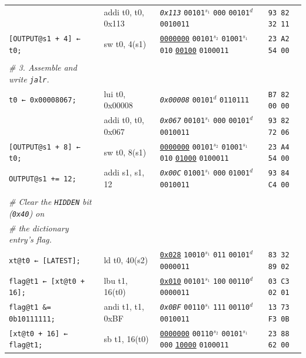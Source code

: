 \documentclass[a4paper,12pt,final]{article}
\begin{document}
\begin{table}[!htbp]
\begin{adjustwidth}{-1cm}{-1cm}
\begin{center}
\begin{tabular}{l|ll|l}
 & addi t0, t0, 0x113 & \emph{\texttt{0x113}}                    \texttt{00101}​\(^{s_{1}}\) \texttt{000} \texttt{00101}​\(^{d}\)  \texttt{0010011} & \texttt{93 82 32 11}\\[0pt]
\texttt{[OUTPUT@s1 + 4] ← t0;} & sw t0, 4(s1) & \uline{\texttt{0000000}} \texttt{00101}​\(^{s_{2}}\) \texttt{01001}​\(^{s_{1}}\) \texttt{010} \uline{\texttt{00100}} \texttt{0100011} & \texttt{23 A2 54 00}\\[0pt]
 &  &  & \\[0pt]
\emph{\# 3. Assemble and write \texttt{jalr}.} &  &  & \\[0pt]
\texttt{t0 ← 0x00008067;} & lui t0, 0x00008 & \emph{\texttt{0x00008}}                                                  \texttt{00101}​\(^{d}\)  \texttt{0110111} & \texttt{B7 82 00 00}\\[0pt]
 & addi t0, t0, 0x067 & \emph{\texttt{0x067}}                    \texttt{00101}​\(^{s_{1}}\) \texttt{000} \texttt{00101}​\(^{d}\)  \texttt{0010011} & \texttt{93 82 72 06}\\[0pt]
\texttt{[OUTPUT@s1 + 8] ← t0;} & sw t0, 8(s1) & \uline{\texttt{0000000}} \texttt{00101}​\(^{s_{2}}\) \texttt{01001}​\(^{s_{1}}\) \texttt{010} \uline{\texttt{01000}} \texttt{0100011} & \texttt{23 A4 54 00}\\[0pt]
\texttt{OUTPUT@s1 += 12;} & addi s1, s1, 12 & \emph{\texttt{0x00C}}                    \texttt{01001}​\(^{s_{1}}\) \texttt{000} \texttt{01001}​\(^{d}\)  \texttt{0010011} & \texttt{93 84 C4 00}\\[0pt]
 &  &  & \\[0pt]
\emph{\# Clear the \texttt{HIDDEN} bit (\texttt{0x40}) on} &  &  & \\[0pt]
\emph{\# the dictionary entry's flag.} &  &  & \\[0pt]
\texttt{xt@t0 ← [LATEST];} & ld t0, 40(s2) & \uline{\texttt{0x028}}                    \texttt{10010}​\(^{s_{1}}\) \texttt{011} \texttt{00101}​\(^{d}\)  \texttt{0000011} & \texttt{83 32 89 02}\\[0pt]
\texttt{flag@t1 ← [xt@t0 + 16];} & lbu t1, 16(t0) & \uline{\texttt{0x010}}                    \texttt{00101}​\(^{s_{1}}\) \texttt{100} \texttt{00110}​\(^{d}\)  \texttt{0000011} & \texttt{03 C3 02 01}\\[0pt]
\texttt{flag@t1 \&= 0b10111111;} & andi t1, t1, 0xBF & \emph{\texttt{0x0BF}}                    \texttt{00110}​\(^{s_{1}}\) \texttt{111} \texttt{00110}​\(^{d}\)  \texttt{0010011} & \texttt{13 73 F3 0B}\\[0pt]
\texttt{[xt@t0 + 16] ← flag@t1;} & sb t1, 16(t0) & \uline{\texttt{0000000}} \texttt{00110}​\(^{s_{2}}\) \texttt{00101}​\(^{s_{1}}\) \texttt{000} \uline{\texttt{10000}} \texttt{0100011} & \texttt{23 88 62 00}\\[0pt]

\end{tabular}
\end{center}
\end{adjustwidth}
\end{table}
\end{document}
